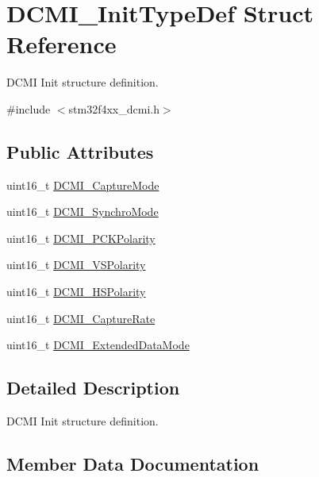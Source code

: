 \hypertarget{struct_d_c_m_i___init_type_def}{}\section{D\+C\+M\+I\+\_\+\+Init\+Type\+Def Struct Reference}
\label{struct_d_c_m_i___init_type_def}


D\+C\+M\+I Init structure definition.  




{\ttfamily \#include $<$stm32f4xx\+\_\+dcmi.\+h$>$}

\subsection*{Public Attributes}
\begin{DoxyCompactItemize}
\item 
uint16\+\_\+t \hyperlink{struct_d_c_m_i___init_type_def_ad2c303b2a56112ab1b507d972dc70514}{D\+C\+M\+I\+\_\+\+Capture\+Mode}
\item 
uint16\+\_\+t \hyperlink{struct_d_c_m_i___init_type_def_a92a344a3724664c6c5523474624c66af}{D\+C\+M\+I\+\_\+\+Synchro\+Mode}
\item 
uint16\+\_\+t \hyperlink{struct_d_c_m_i___init_type_def_a2768de44e7fa6fc7d9caf816cc5121c8}{D\+C\+M\+I\+\_\+\+P\+C\+K\+Polarity}
\item 
uint16\+\_\+t \hyperlink{struct_d_c_m_i___init_type_def_aa14287a4d834253e11e0f8682c9596c5}{D\+C\+M\+I\+\_\+\+V\+S\+Polarity}
\item 
uint16\+\_\+t \hyperlink{struct_d_c_m_i___init_type_def_ab9f87fbe99bdd7f38700379896175512}{D\+C\+M\+I\+\_\+\+H\+S\+Polarity}
\item 
uint16\+\_\+t \hyperlink{struct_d_c_m_i___init_type_def_ada6d27385f753e9776df18bd76faf5ab}{D\+C\+M\+I\+\_\+\+Capture\+Rate}
\item 
uint16\+\_\+t \hyperlink{struct_d_c_m_i___init_type_def_a9b4d6a13bf652b0683240d269015ff7c}{D\+C\+M\+I\+\_\+\+Extended\+Data\+Mode}
\end{DoxyCompactItemize}


\subsection{Detailed Description}
D\+C\+M\+I Init structure definition. 

\subsection{Member Data Documentation}
\hypertarget{struct_d_c_m_i___init_type_def_ad2c303b2a56112ab1b507d972dc70514}{}

